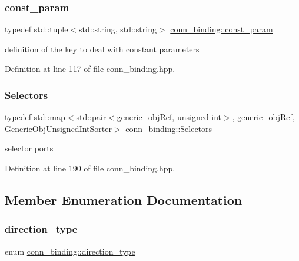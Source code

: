 \subsubsection{\texorpdfstring{const\+\_\+param}{const\_param}}
{\footnotesize\ttfamily typedef std\+::tuple$<$std\+::string, std\+::string$>$ \hyperlink{classconn__binding_a08cb5241cd588e215f61ab30d27a14c0}{conn\+\_\+binding\+::const\+\_\+param}}



definition of the key to deal with constant parameters 



Definition at line 117 of file conn\+\_\+binding.\+hpp.

\mbox{\label{classconn__binding_a1994d72baf506bcb1d94e0cfede4258b}} 
\subsubsection{\texorpdfstring{Selectors}{Selectors}}
{\footnotesize\ttfamily typedef std\+::map$<$std\+::pair$<$\hyperlink{generic__obj_8hpp_acb533b2ef8e0fe72e09a04d20904ca81}{generic\+\_\+obj\+Ref}, unsigned int$>$, \hyperlink{generic__obj_8hpp_acb533b2ef8e0fe72e09a04d20904ca81}{generic\+\_\+obj\+Ref}, \hyperlink{classGenericObjUnsignedIntSorter}{Generic\+Obj\+Unsigned\+Int\+Sorter}$>$ \hyperlink{classconn__binding_a1994d72baf506bcb1d94e0cfede4258b}{conn\+\_\+binding\+::\+Selectors}\hspace{0.3cm}{\ttfamily [protected]}}



selector ports 



Definition at line 190 of file conn\+\_\+binding.\+hpp.



\subsection{Member Enumeration Documentation}
\mbox{\label{classconn__binding_af1575e7a7dc7acd00fc5c947f413c663}} 
\subsubsection{\texorpdfstring{direction\+\_\+type}{direction\_type}}
{\footnotesize\ttfamily enum \hyperlink{classconn__binding_af1575e7a7dc7acd00fc5c947f413c663}{conn\+\_\+binding\+::direction\+\_\+type}}



